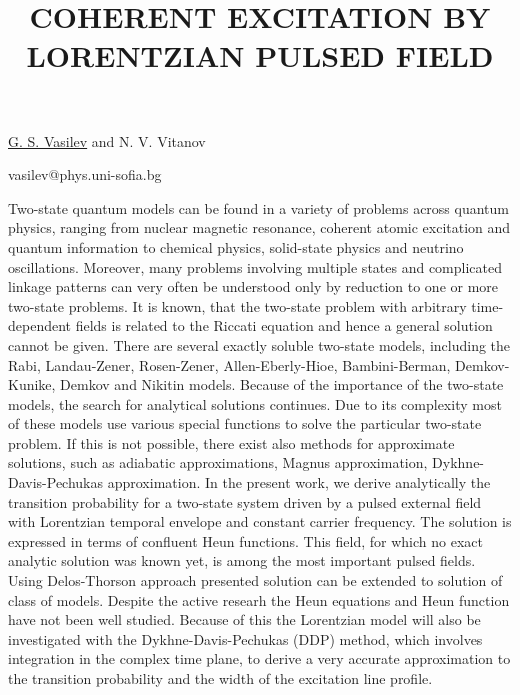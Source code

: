 \title{COHERENT EXCITATION BY LORENTZIAN PULSED FIELD}

\underline{G. S. Vasilev} and N. V. Vitanov
 

{\normalsize{

\vspace{-4mm} \unisofia


\email vasilev@phys.uni-sofia.bg}}

Two-state quantum
models can be found in a variety of problems across quantum
physics, ranging from nuclear magnetic resonance, coherent atomic
excitation and quantum information to chemical physics,
solid-state physics and neutrino oscillations. Moreover, many
problems involving multiple states and complicated linkage
patterns can very often be understood only by reduction to one or
more two-state problems. It is known, that the two-state
problem with arbitrary time-dependent fields is related to the
Riccati equation and hence a general solution cannot be given.
There are several exactly soluble two-state models, including the
Rabi, Landau-Zener, Rosen-Zener, Allen-Eberly-Hioe, Bambini-Berman,
Demkov-Kunike, Demkov  and Nikitin
models. Because of the importance of the two-state models, the
search for analytical solutions continues. Due to its complexity
most of these models use various special functions to solve the
particular two-state problem. If this is not possible, there exist
also methods for approximate solutions, such as adiabatic
approximations, Magnus approximation, Dykhne-Davis-Pechukas
approximation.
In the present work, we derive analytically the transition
probability for a two-state system driven by a pulsed external
field with Lorentzian temporal envelope and constant carrier
frequency. The solution is expressed in terms of confluent Heun
functions. This field, for which no exact analytic solution was
known yet, is among the most important pulsed fields. Using
Delos-Thorson approach presented solution can be extended to
solution of class of models. Despite the active researh the Heun
equations and Heun function have not been well studied. Because of
this the Lorentzian model will also be investigated with the
Dykhne-Davis-Pechukas (DDP) method, which involves integration
in the complex time plane, to derive a very accurate approximation
to the transition probability and the width of the excitation line
profile.


\vspace{\baselineskip}
